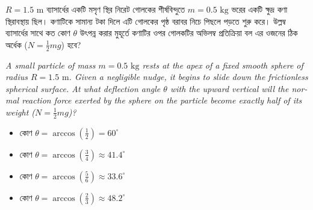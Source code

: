 \documentclass[12pt, a4paper]{article}
\begin{document}
\begin{tcolorbox}[questionbox={প্রশ্ন (Question) 28}]
    \noindent
    $R = 1.5\text{ m}$ ব্যাসার্ধের একটি মসৃণ স্থির নিরেট গোলকের শীর্ষবিন্দুতে $m = 0.5\text{ kg}$ ভরের একটি ক্ষুদ্র কণা স্থিরাবস্থায় ছিল। কণাটিকে সামান্য টকা দিলে এটি গোলকের পৃষ্ঠ বরাবর নিচে পিছলে পড়তে শুরু করে। উল্লম্ব ব্যাসার্ধের সাথে কত কোণ $\theta$ উৎপন্ন করার মুহূর্তে কণাটির ওপর গোলকটির অভিলম্ব প্রতিক্রিয়া বল এর ওজনের ঠিক অর্ধেক ($N = \frac{1}{2} mg$) হবে?
    
    \vspace{0.8em}
    \begin{english}
    \noindent\textit{\color{darkgray}
    A small particle of mass $m = 0.5\text{ kg}$ rests at the apex of a fixed smooth sphere of radius $R = 1.5\text{ m}$. Given a negligible nudge, it begins to slide down the frictionless spherical surface. At what deflection angle $\theta$ with the upward vertical will the normal reaction force exerted by the sphere on the particle become exactly half of its weight ($N = \frac{1}{2} mg$)?
    }
    \end{english}
\end{tcolorbox}

\vspace{1em}
\begin{center}
\end{center}
\vspace{1em}

\begin{itemize}[label={}, leftmargin=1cm, itemsep=0.5em]
    \item[\textbf{A)}] কোণ $\theta = \arccos\left(\frac{1}{2}\right) = 60^\circ$
    \item[\textbf{B)}] কোণ $\theta = \arccos\left(\frac{3}{4}\right) \approx 41.4^\circ$
    \item[\textbf{C)}] কোণ $\theta = \arccos\left(\frac{5}{6}\right) \approx 33.6^\circ$
    \item[\textbf{D)}] কোণ $\theta = \arccos\left(\frac{2}{3}\right) \approx 48.2^\circ$
\end{itemize}
\end{document}
